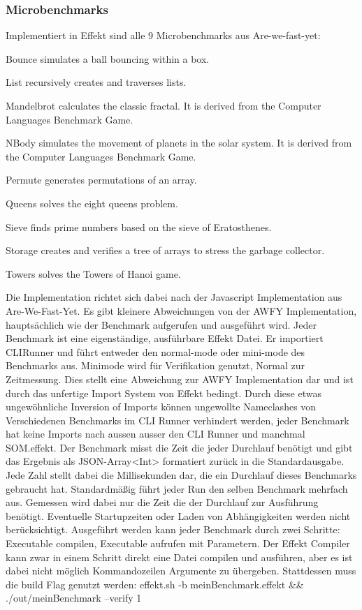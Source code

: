 \subsubsection{ Microbenchmarks }
Implementiert in Effekt sind alle 9 Microbenchmarks aus Are-we-fast-yet:

Bounce simulates a ball bouncing within a box.

List recursively creates and traverses lists.

Mandelbrot calculates the classic fractal. It is derived from the Computer Languages Benchmark Game.

NBody simulates the movement of planets in the solar system. It is derived from the Computer Languages Benchmark Game.

Permute generates permutations of an array.

Queens solves the eight queens problem.

Sieve finds prime numbers based on the sieve of Eratosthenes.

Storage creates and verifies a tree of arrays to stress the garbage collector.

Towers solves the Towers of Hanoi game.

Die Implementation richtet sich dabei nach der Javascript Implementation aus Are-We-Fast-Yet.
Es gibt kleinere Abweichungen von der AWFY Implementation, hauptsächlich wie der Benchmark aufgerufen und ausgeführt wird. 
Jeder Benchmark ist eine eigenständige, ausführbare Effekt Datei. Er importiert CLIRunner und führt entweder den normal-mode oder mini-mode des Benchmarks aus. Minimode wird für Verifikation genutzt, Normal zur Zeitmessung.
Dies stellt eine Abweichung zur AWFY Implementation dar und ist durch das unfertige Import System von Effekt bedingt.
Durch diese etwas ungewöhnliche Inversion of Imports können ungewollte Nameclashes von Verschiedenen Benchmarks im CLI Runner verhindert werden, jeder Benchmark hat keine Imports nach aussen ausser den CLI Runner und manchmal SOM.effekt.
Der Benchmark misst die Zeit die jeder Durchlauf benötigt und gibt das Ergebnis als JSON-Array<Int> formatiert zurück in die Standardausgabe. Jede Zahl stellt dabei die Millisekunden dar, die ein Durchlauf dieses Benchmarks gebraucht hat.
Standardmäßig führt jeder Run den selben Benchmark mehrfach aus.
Gemessen wird dabei nur die Zeit die der Durchlauf zur Ausführung benötigt. Eventuelle Startupzeiten oder Laden von Abhängigkeiten werden nicht berücksichtigt.
Ausgeführt werden kann jeder Benchmark durch zwei Schritte: Executable compilen, Executable aufrufen mit Parametern.
Der Effekt Compiler kann zwar in einem Schritt direkt eine Datei compilen und ausführen, aber es ist dabei nicht möglich Kommandozeilen Argumente zu übergeben.
Stattdessen muss die build Flag genutzt werden:
effekt.sh -b meinBenchmark.effekt && ./out/meinBenchmark --verify 1

